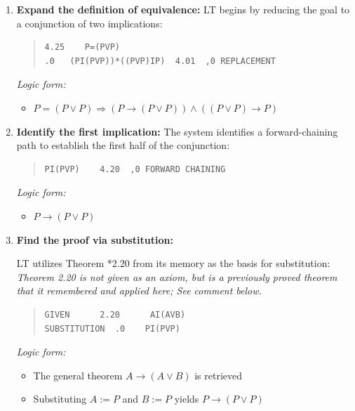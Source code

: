 \documentclass[journal]{IEEEtran}
\begin{document}
\begin{enumerate}

\item \textbf{Expand the definition of equivalence:}
LT begins by reducing the goal to a conjunction of two implications:
\begin{quote}
\begin{verbatim}
4.25    P=(PVP)
.0   (PI(PVP))*((PVP)IP)  4.01  ,0 REPLACEMENT
\end{verbatim}
\end{quote}
\textit{Logic form:}
\begin{itemize}
    \item[] $P = (P \lor P) \Rightarrow (P \rightarrow (P \lor P)) \land ((P \lor P) \rightarrow P)$ 
\end{itemize}

\item \textbf{Identify the first implication:}
The system identifies a forward-chaining path to establish the first half of the conjunction:
\begin{quote}
\begin{verbatim}
PI(PVP)    4.20  ,0 FORWARD CHAINING
\end{verbatim}
\end{quote}
\textit{Logic form:} 
\begin{itemize}
    \item[] $P \rightarrow (P \lor P)$
\end{itemize}

\item \textbf{Find the proof via substitution:}

LT utilizes Theorem *2.20 from its memory as the basis for
substitution: \textit{Theorem 2.20 is not given as an axiom, but is a
previously proved theorem that it remembered and applied here; See
comment below.}

\begin{quote}
\begin{verbatim}
GIVEN      2.20      AI(AVB)
SUBSTITUTION  .0    PI(PVP)
\end{verbatim}
\end{quote}
\textit{Logic form:} 
\begin{itemize}
    \item[] The general theorem $A \rightarrow (A \lor B)$ is retrieved
    \item[] Substituting $A := P$ and $B := P$ yields $P \rightarrow (P \lor P)$
\end{itemize}


\end{enumerate}
\end{document}
